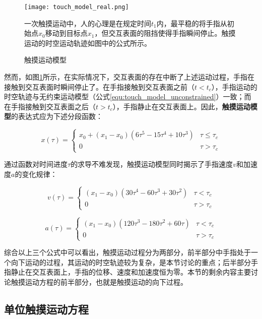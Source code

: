 \begin{figure}
	\centering
	\texttt{[image: touch\_model\_real.png]}
	\caption*{一次触摸运动中，人的心理是在规定时间$t_1$内，最平稳的将手指从初始点$x_0$移动到目标点$x_1$，但交互表面的阻挡使得手指瞬间停止。触摸运动的时空运动轨迹如图中的公式所示。}
	\caption{触摸运动模型}
	\label{fig:touch_model_real}
\end{figure}

然而，如图\ref{fig:touch_model_real}所示，在实际情况下，交互表面的存在中断了上述运动过程，手指在接触到交互表面时瞬间停止了。在手指接触到交互表面之前（$t<t_c$），手指运动的时空轨迹与无约束运动模型（公式\ref{equ:touch_model_unconstrained}）一致；而在手指接触到交互表面之后（$t>t_c$），手指静止在交互表面上。因此，\textbf{触摸运动模型}的表达式应为下述分段函数：

\begin{equation}
	x(\tau)=
	\begin{cases}
		x_0+(x_1-x_0)(6\tau^5-15\tau^4+10\tau^3)& \tau\leq\tau_c \\
		0& \tau>\tau_c
	\end{cases}
	\label{equ:touch_model}
\end{equation}

通过函数对时间进度$\tau$的求导不难发现，触摸运动模型同时揭示了手指速度$v$和加速度$a$的变化规律：

\begin{equation}
v(\tau)=
\begin{cases}
	(x_1-x_0)(30\tau^4-60\tau^3+30\tau^2)& \tau<\tau_c \\
	0& \tau>\tau_c
\end{cases}
\label{equ:touch_model_v}
\end{equation}

\begin{equation}
	a(\tau)=
	\begin{cases}
		(x_1-x_0)(120\tau^3-180\tau^2+60\tau)& \tau<\tau_c \\
		0& \tau>\tau_c
	\end{cases}
\label{equ:touch_model_a}
\end{equation}

综合以上三个公式中可以看出，触摸运动过程分为两部分，前半部分中手指处于一个向下运动的过程，其运动的时空轨迹较为复杂，是本节讨论的重点；后半部分手指静止在交互表面上，手指的位移、速度和加速度恒为零。本节的剩余内容主要讨论触摸运动方程的前半部分，也就是触摸运动的向下过程。

\subsection{单位触摸运动方程}

